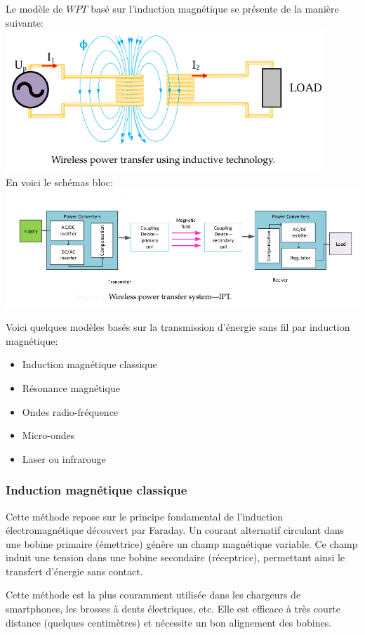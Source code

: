\documentclass[12pt,a4paper,titlepage,notitlepage]{article}
\begin{document}
	Le  modèle de $WPT$ basé sur l'induction magnétique se présente de la manière suivante:\\
	\includegraphics[width=0.9\textwidth]{WPT_inductif} \\ En voici le schémas bloc:\\
	\includegraphics[width=1.1\textwidth]{WPT_inductif_1}
	
	Voici quelques modèles basés sur la transmission d'énergie sans fil par induction magnétique:
	\begin{itemize}
		\item Induction magnétique classique
		\item Résonance magnétique
		\item Ondes radio-fréquence
		\item Micro-ondes
		\item Laser ou infrarouge
	\end{itemize}
	\subsubsection{Induction magnétique classique}
	Cette méthode repose sur le principe fondamental de l’induction électromagnétique découvert par Faraday. Un courant alternatif circulant dans une bobine primaire (émettrice) génère un champ magnétique variable. Ce champ induit une tension dans une bobine secondaire (réceptrice), permettant ainsi le transfert d’énergie sans contact.
	
	Cette méthode est la plus couramment utilisée dans les chargeurs de smartphones, les brosses à dents électriques, etc. Elle est efficace à très courte distance (quelques centimètres) et nécessite un bon alignement des bobines.
\end{document}
